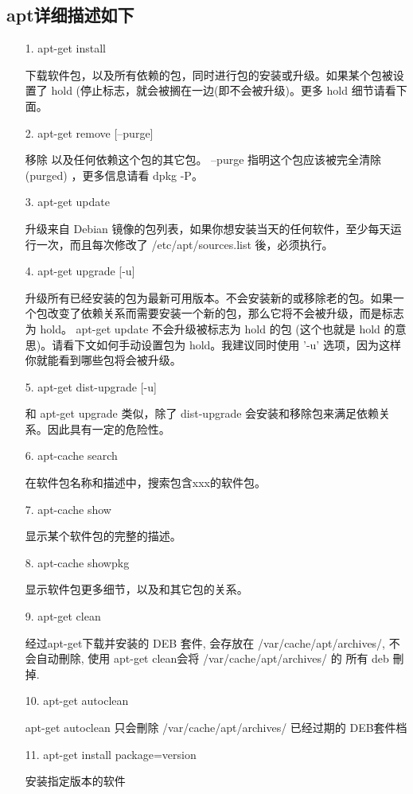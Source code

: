 \documentclass[a4paper,left=1.5cm,right=1.5cm,11pt]{article}
\begin{document}
\subsection{apt详细描述如下}
\begin{itemize}
	\item[1.]apt-get install \par
		下载软件包，以及所有依赖的包，同时进行包的安装或升级。如果某个包被设置了 hold (停止标志，就会被搁在一边(即不会被升级)。更多 hold 细节请看下面。
	\item[2.]apt-get remove [--purge]\par
		移除 以及任何依赖这个包的其它包。
		--purge 指明这个包应该被完全清除 (purged) ，更多信息请看 dpkg -P。
	\item[3.]apt-get update\par
		升级来自 Debian 镜像的包列表，如果你想安装当天的任何软件，至少每天运行一次，而且每次修改了
		/etc/apt/sources.list 後，必须执行。
	\item[4.]apt-get upgrade [-u]\par
		升级所有已经安装的包为最新可用版本。不会安装新的或移除老的包。如果一个包改变了依赖关系而需要安装一个新的包，那么它将不会被升级，而是标志为 hold。
		apt-get update 不会升级被标志为 hold 的包 (这个也就是 hold 的意思)。请看下文如何手动设置包为 hold。我建议同时使用 '-u' 选项，因为这样你就能看到哪些包将会被升级。
	\item[5.]apt-get dist-upgrade [-u]\par	
		和 apt-get upgrade 类似，除了 dist-upgrade 会安装和移除包来满足依赖关系。因此具有一定的危险性。
	\item[6.]apt-cache search\par
		在软件包名称和描述中，搜索包含xxx的软件包。
	\item[7.]apt-cache show\par
		显示某个软件包的完整的描述。
	\item[8.]apt-cache showpkg\par
		显示软件包更多细节，以及和其它包的关系。
	\item[9.]apt-get clean\par
		经过apt-get下载并安装的 DEB 套件, 会存放在 /var/cache/apt/archives/, 不会自动刪除, 使用 apt-get clean会将 /var/cache/apt/archives/ 的 所有 deb 刪掉.	
	\item[10.]apt-get autoclean\par
		apt-get autoclean 只会刪除 /var/cache/apt/archives/ 已经过期的 DEB套件档
	\item[11.]apt-get install package=version\par
		安装指定版本的软件
\end{itemize}
\end{document}
